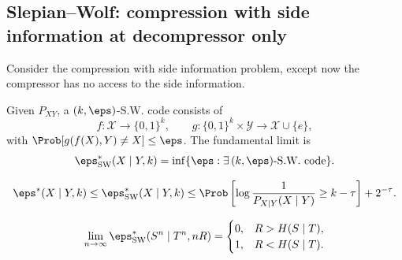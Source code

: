 \subsection*{Slepian--Wolf: compression with side information at decompressor only}
Consider the compression with side information problem, except now the compressor has no access to the side information.
\begin{center}
\end{center}
\begin{definition}[S.W. code, 7.4]
Given $P_{XY}$, a $(k,\eps)$-S.W. code consists of
\[
f:\mathcal X\to\{0,1\}^k,\qquad
g:\{0,1\}^k\times\mathcal Y\to\mathcal X\cup\{e\},
\]
with $\Prob[g(f(X),Y)\ne X]\le\eps$. The fundamental limit is
\[
\eps^*_{\rm SW}(X\mid Y,k)=\inf\{\eps:\exists\,(k,\eps)\text{-S.W. code}\}.
\]
\end{definition}
\begin{theorem}
\[
\eps^*(X\mid Y,k)\le\eps^*_{\rm SW}(X\mid Y,k)
\le\Prob\left[\log\frac1{P_{X\mid Y}(X\mid Y)}\ge k-\tau\right]+2^{-\tau}.
\]
\end{theorem}
\begin{corollary}[7.3]
\[
\lim_{n\to\infty}\eps^*_{\rm SW}(S^n\mid T^n,nR)
=\begin{cases}0,&R>H(S\mid T),\\1,&R<H(S\mid T).
\end{cases}
\]
\end{corollary}
